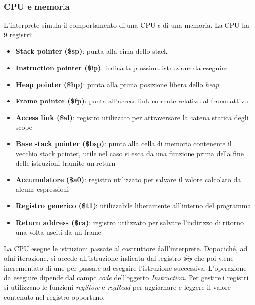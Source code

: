 \documentclass[../../main]{subfiles}
\begin{document}
\subsubsection{CPU e memoria}
L'interprete simula il comportamento di una CPU e di una memoria.
La CPU ha 9 registri: 
\begin{itemize}
    \item \textbf{Stack pointer (\$sp)}: punta alla cima dello stack
    \item \textbf{Instruction pointer (\$ip)}: indica la prossima istruzione da eseguire
    \item \textbf{Heap pointer (\$hp)}: punta alla prima posizione libera dello \emph{heap}
    \item \textbf{Frame pointer (\$fp)}: punta all'access link corrente relativo al frame attivo
    \item \textbf{Access link (\$al)}: registro utilizzato per attraversare la catena statica degli scope
    \item \textbf{Base stack pointer (\$bsp)}: punta alla cella di memoria contenente il vecchio stack pointer, utile nel caso si esca da una funzione prima della fine delle istruzioni tramite un return
    \item \textbf{Accumulatore (\$a0)}: registro utilizzato per salvare il valore calcolato da alcune espressioni
    \item \textbf{Registro generico (\$t1)}: utilizzabile liberamente all'interno del programma  
    \item \textbf{Return address (\$ra)}: registro utilizzato per salvare l'indirizzo di ritorno una volta usciti da un frame
\end{itemize}
La CPU esegue le istruzioni passate al costruttore dall'interprete. Dopodiché, ad ofni iterazione, si accede all'istruzione indicata dal registro \emph{\$ip} che poi viene incrementato di uno per passare ad eseguire l'istruzione successiva. L'operazione da eseguire dipende dal campo \emph{code} dell'oggetto \emph{Instruction}.  
\newline
Per gestire i registri si utilizzano le funzioni \emph{regStore} e \emph{regRead} per aggiornare e leggere il valore contenuto nel registro opportuno.
\newline
\end{document}

